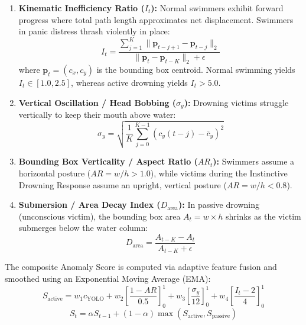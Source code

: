 \documentclass[a4paper,11pt]{article}
\begin{document}
\begin{enumerate}
    \item \textbf{Kinematic Inefficiency Ratio ($I_t$):} Normal swimmers exhibit forward progress where total path length approximates net displacement. Swimmers in panic distress thrash violently in place:
    \begin{equation}
        I_t = \frac{\sum_{j=1}^{K} \|\mathbf{p}_{t-j+1} - \mathbf{p}_{t-j}\|_2}{\|\mathbf{p}_t - \mathbf{p}_{t-K}\|_2 + \epsilon}
    \end{equation}
    where $\mathbf{p}_t = (c_x, c_y)$ is the bounding box centroid. Normal swimming yields $I_t \in [1.0, 2.5]$, whereas active drowning yields $I_t > 5.0$.

    \item \textbf{Vertical Oscillation / Head Bobbing ($\sigma_y$):} Drowning victims struggle vertically to keep their mouth above water:
    \begin{equation}
        \sigma_y = \sqrt{\frac{1}{K} \sum_{j=0}^{K-1} (c_y(t-j) - \bar{c}_y)^2}
    \end{equation}

    \item \textbf{Bounding Box Verticality / Aspect Ratio ($AR_t$):} Swimmers assume a horizontal posture ($AR = w/h > 1.0$), while victims during the Instinctive Drowning Response assume an upright, vertical posture ($AR = w/h < 0.8$).

    \item \textbf{Submersion / Area Decay Index ($D_{\text{area}}$):} In passive drowning (unconscious victim), the bounding box area $A_t = w \times h$ shrinks as the victim submerges below the water column:
    \begin{equation}
        D_{\text{area}} = \frac{A_{t-K} - A_t}{A_{t-K} + \epsilon}
    \end{equation}
\end{enumerate}

The composite Anomaly Score is computed via adaptive feature fusion and smoothed using an Exponential Moving Average (EMA):
\begin{equation}
    S_{\text{active}} = w_1 c_{\text{YOLO}} + w_2 \left[\frac{1 - AR}{0.5}\right]_0^1 + w_3 \left[\frac{\sigma_y}{12}\right]_0^1 + w_4 \left[\frac{I_t - 2}{4}\right]_0^1
\end{equation}
\begin{equation}
    S_t = \alpha S_{t-1} + (1 - \alpha) \max(S_{\text{active}}, S_{\text{passive}})
\end{equation}
\end{document}
